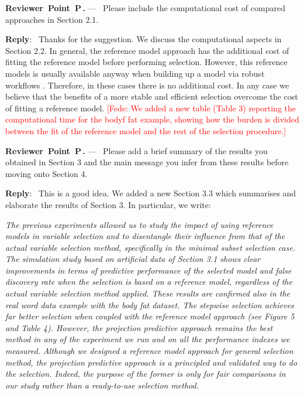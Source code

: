 \documentclass[11pt]{article}
\newcounter{reviewer}
\newcounter{point}[reviewer]
\renewcommand{\thepoint}{P\,\thereviewer.\arabic{point}}
\newenvironment{point}
   {\refstepcounter{point} \bigskip \noindent \begin{sf}{\textbf{Reviewer~Point~\thepoint} } ---\ }
   {\par \end{sf}}
\newenvironment{reply}
   {\medskip \noindent \textbf{Reply}:\  }
   {\medskip}
\newcommand{\fede}[1]{\textcolor{red}{[Fede: #1]}}
\begin{document}
\begin{point}
Please include the computational cost of compared approaches in Section 2.1. 
\end{point}

\begin{reply}
Thanks for the suggestion. We discuss the computational aspects in Section 2.2. In general, the reference model approach has the additional cost of fitting the reference model before performing selection. However, this reference models is usually available anyway when building up a model via robust workflows \citep{gelman2020bayesian}. Therefore, in these cases there is no additional cost. In any case we believe that the benefits of a more stable and efficient selection overcome the cost of fitting a reference model.
\fede{We added a new table (Table 3) reporting the computational time for the bodyf fat example, showing how the burden is divided between the fit of the reference model and the rest of the selection procedure.}
\end{reply}

\begin{point}
Please add a brief summary of the results you obtained in Section 3 and the main message you infer from these results before moving onto Section 4.
\end{point}

\begin{reply}
This is a good idea. We added a new Section 3.3 which summarises and elaborate the results of Section 3. In particular, we write:

\vspace{0.5\baselineskip}
\textit{
The previous experiments allowed us to study the impact of using reference models in variable selection and to disentangle their influence from that of the actual variable selection method, specifically in the minimal subset selection case.
The simulation study based on artificial data of Section 3.1 shows clear improvements in terms of predictive performance of the selected model and false discovery rate when the selection is based on a reference model, regardless of the actual variable selection method applied. These results are confirmed also in the real word data example with the body fat dataset. The stepwise selection achieves far better selection when coupled with the reference model approach (see Figure 5 and Table 4). However, the projection predictive approach remains the best method in any of the experiment we run and on all the performance indexes we measured. Although we designed a reference model approach for general selection method, the projection predictive approach is a principled and validated way to do the selection. Indeed, the purpose of the former is only for fair comparisons in our study rather than a ready-to-use selection method.
}
\vspace{0.5\baselineskip}
\end{reply}
\end{document}
